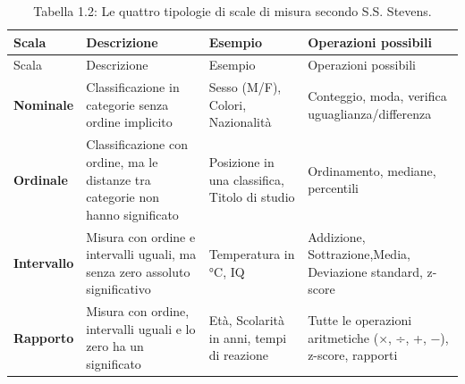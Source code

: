 \documentclass[
  italian,
  letterpaper,
  paper=A4,
  headinclude=on,
  footinclude=on,
  12pt]{scrbook}
\begin{document}
\begingroup
{\scriptsize

\begin{longtable}[]{@{}
  >{\raggedright\arraybackslash}p{}
  >{\raggedright\arraybackslash}p{}
  >{\raggedright\arraybackslash}p{}
  >{\raggedright\arraybackslash}p{}@{}}
\caption{Tabella 1.2: Le quattro tipologie di scale di misura secondo
S.S. Stevens.}\tabularnewline
\toprule\noalign{}
\begin{minipage}[b]{\linewidth}\raggedright
Scala
\end{minipage} & \begin{minipage}[b]{\linewidth}\raggedright
Descrizione
\end{minipage} & \begin{minipage}[b]{\linewidth}\raggedright
Esempio
\end{minipage} & \begin{minipage}[b]{\linewidth}\raggedright
Operazioni possibili
\end{minipage} \\
\midrule\noalign{}
\endfirsthead
\toprule\noalign{}
\begin{minipage}[b]{\linewidth}\raggedright
Scala
\end{minipage} & \begin{minipage}[b]{\linewidth}\raggedright
Descrizione
\end{minipage} & \begin{minipage}[b]{\linewidth}\raggedright
Esempio
\end{minipage} & \begin{minipage}[b]{\linewidth}\raggedright
Operazioni possibili
\end{minipage} \\
\midrule\noalign{}
\endhead
\bottomrule\noalign{}
\endlastfoot
\textbf{Nominale} & Classificazione in categorie senza ordine implicito
& Sesso (M/F), Colori, Nazionalità & Conteggio, moda, verifica
uguaglianza/differenza \\
\textbf{Ordinale} & Classificazione con ordine, ma le distanze tra
categorie non hanno significato & Posizione in una classifica, Titolo di
studio & Ordinamento, mediane, percentili \\
\textbf{Intervallo} & Misura con ordine e intervalli uguali, ma senza
zero assoluto significativo & Temperatura in °C, IQ & Addizione,
Sottrazione,Media, Deviazione standard, z-score \\
\textbf{Rapporto} & Misura con ordine, intervalli uguali e lo zero ha un
significato & Età, Scolarità in anni, tempi di reazione & Tutte le
operazioni aritmetiche (×, ÷, +, −), z-score, rapporti \\
\end{longtable}

}
\end{document}
